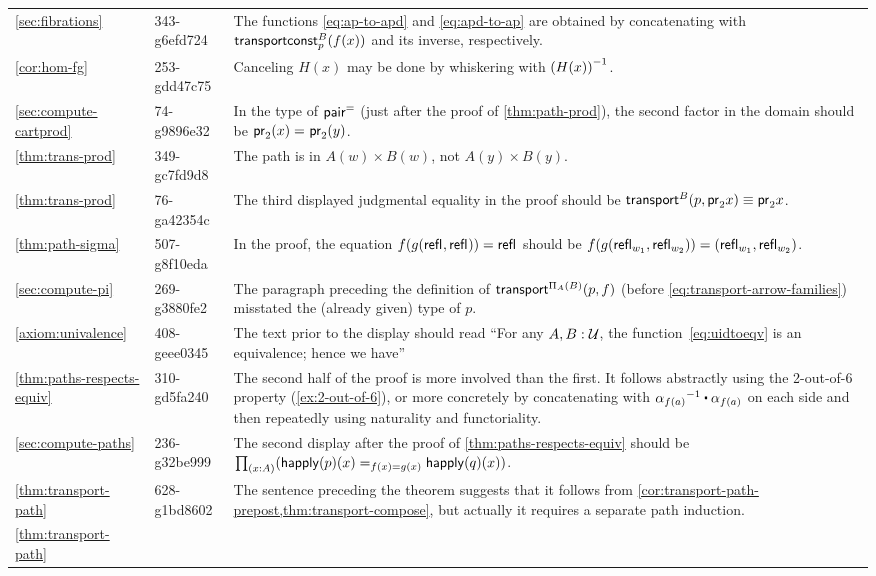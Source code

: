 \documentclass[
%
%
11pt %
]{article}
\begin{document}
\begin{longtable}{llp{10.5cm}}
  \cref{sec:fibrations}
  & 343-g6efd724
  & The functions \cref{eq:ap-to-apd} and \cref{eq:apd-to-ap} are obtained by concatenating with $\mathsf{transportconst}^{B}_{p}(f(x))$ and its inverse, respectively.\\
  \cref{cor:hom-fg}
  & 253-gdd47c75
  & Canceling $H(x)$ may be done by whiskering with $\mathord{{(H(x))}^{-1}}$.\\
  \cref{sec:compute-cartprod}
  & 74-g9896e32
  & In the type of $\mathsf{pair}^{\mathord{=}}$ (just after the proof of \cref{thm:path-prod}), the second factor in the domain should be $\mathsf{pr}_{2}(x) =_{} \mathsf{pr}_{2}(y)$.\\
  \cref{thm:trans-prod}
  & 349-gc7fd9d8
  & The path is in $A(w)\times B(w)$, not $A(y)\times B(y)$.\\
  \cref{thm:trans-prod}
  & 76-ga42354c
  & The third displayed judgmental equality in the proof should be $\mathsf{transport}^{B}(p,\mathsf{pr}_{2} x) \equiv \mathsf{pr}_{2} x$.\\
  \cref{thm:path-sigma}
  & 507-g8f10eda
  & In the proof, the equation $f(g(\mathsf{refl}_{},\mathsf{refl}_{}))=\mathsf{refl}_{}$ should be $f (g(\mathsf{refl}_{w_1},\mathsf{refl}_{w_2})) = (\mathsf{refl}_{w_1},\mathsf{refl}_{w_2})$.\\
  \cref{sec:compute-pi}
  & 269-g3880fe2
  & The paragraph preceding the definition of $\mathsf{transport}^{\Pi_A(B)}(p,f)$ (before \cref{eq:transport-arrow-families}) misstated the (already given) type of $p$.\\
  \cref{axiom:univalence}
  & 408-geee0345
  & The text prior to the display should read ``For any $A,B:\mathcal{U}$, the function~\eqref{eq:uidtoeqv} is an equivalence; hence we have''\\
  \cref{thm:paths-respects-equiv}
  & 310-gd5fa240
  & The second half of the proof is more involved than the first.
  It follows abstractly using the 2-out-of-6 property (\cref{ex:2-out-of-6}), or more concretely by concatenating with $\opp{\alpha_{f(a)}} \ct {\alpha_{f(a)}}$ on each side and then repeatedly using naturality and functoriality.\\
  \cref{sec:compute-paths}
  & 236-g32be999
  & The second display after the proof of \cref{thm:paths-respects-equiv} should be $\prd{x:A} (\id[f(x)=g(x)] {\happly(p)(x)}{\happly(q)(x)})$.\\
  \cref{thm:transport-path}
  & 628-g1bd8602
  & The sentence preceding the theorem suggests that it follows from \cref{cor:transport-path-prepost,thm:transport-compose}, but actually it requires a separate path induction.\\
  \cref{thm:transport-path}

\end{longtable}
\end{document}

